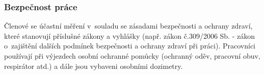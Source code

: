 \subsubsection{Bezpečnost práce}

Členové  se účastní měření v~souladu se zásadami bezpečnosti a
ochrany zdraví, které stanovují příslušné zákony a vyhlášky
(např. zákon č.309/2006 Sb. - zákon o~zajištění dalších podmínek
bezpečnosti a ochrany zdraví při práci). Pracovníci používají při
výjezdech osobní ochranné pomůcky (ochranný oděv, pracovní obuv,
respirátor atd.) a dále jsou vybaveni osobními dozimetry.

